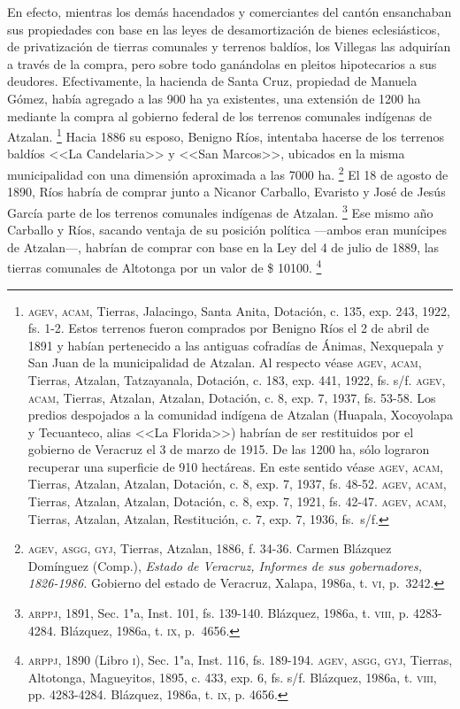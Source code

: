 \documentclass[14pt,twoside,final]{extbook} %
\let\oldfootnote\footnote
\renewcommand\footnote[1]{%
\oldfootnote{\hspace{1mm}#1}}
\begin{document}
En efecto, mientras los demás hacendados y comerciantes del cantón ensanchaban sus propiedades con base en las leyes de desamortización de bienes eclesiásticos, de privatización de tierras comunales y terrenos baldíos, los Villegas las adquirían a través de la compra, pero sobre todo ganándolas en pleitos hipotecarios a sus deudores. Efectivamente, la hacienda de Santa Cruz, propiedad de Manuela Gómez, había agregado a las 900 ha ya existentes, una extensión de 1200 ha mediante la compra al gobierno federal de los terrenos comunales indígenas de Atzalan.\footnote{\textsc{agev, acam}, Tierras, Jalacingo, Santa Anita, Dotación, c. 135, exp. 243, 1922, fs. 1-2. Estos terrenos fueron comprados por Benigno Ríos el 2 de abril de 1891 y habían pertenecido a las antiguas cofradías de Ánimas, Nexquepala y San Juan de la municipalidad de Atzalan. Al respecto véase \textsc{agev}, \textsc{acam}, Tierras, Atzalan, Tatzayanala, Dotación, c. 183, exp. 441, 1922, fs. s/f. \textsc{agev}, \textsc{acam}, Tierras, Atzalan, Atzalan, Dotación, c. 8, exp. 7, 1937, fs. 53-58. Los predios despojados a la comunidad indígena de Atzalan (Huapala, Xocoyolapa y Tecuanteco, alias <<La Florida>>) habrían de ser restituidos por el gobierno de Veracruz el 3 de marzo de 1915. De las 1200 ha, sólo lograron recuperar una superficie de 910 hectáreas. En este sentido véase \textsc{agev}, \textsc{acam}, Tierras, Atzalan, Atzalan, Dotación, c. 8, exp. 7, 1937, fs. 48-52. \textsc{agev}, \textsc{acam}, Tierras, Atzalan, Atzalan, Dotación, c. 8, exp. 7, 1921, fs. 42-47. \textsc{agev}, \textsc{acam}, Tierras, Atzalan, Atzalan, Restitución, c. 7, exp. 7, 1936, fs.~s/f.} Hacia 1886 su esposo, Benigno Ríos, intentaba hacerse de los terrenos baldíos <<La Candelaria>> y <<San Marcos>>, ubicados en la misma municipalidad con una dimensión aproximada a las 7000 ha.\footnote{\textsc{agev, asgg, gyj}, Tierras, Atzalan, 1886, f. 34-36. Carmen Blázquez Domínguez (Comp.), \emph{Estado de Veracruz, Informes de sus gobernadores, 1826-1986.} Gobierno del estado de Veracruz, Xalapa, 1986a, t. \textsc{vi}, p.~3242.} El 18 de agosto de 1890, Ríos habría de comprar junto a Nicanor Carballo, Evaristo y José de Jesús García parte de los terrenos comunales indígenas de Atzalan.\footnote{\textsc{arppj}, 1891, Sec. 1"a, Inst. 101, fs. 139-140. Blázquez, 1986a, t. \textsc{viii}, p. 4283-4284. Blázquez, 1986a, t. \textsc{ix}, p.~4656.} Ese mismo año Carballo y Ríos, sacando ventaja de su posición política ---ambos eran munícipes de Atzalan---, habrían de comprar con base en la Ley del 4 de julio de 1889, las tierras comunales de Altotonga por un valor de \$ 10100.\footnote{\textsc{arppj}, 1890 (Libro \textsc{i}), Sec. 1"a, Inst. 116, fs. 189-194. \textsc{agev, asgg, gyj}, Tierras, Altotonga, Magueyitos, 1895, c. 433, exp. 6, fs. s/f. Blázquez, 1986a, t. \textsc{viii}, pp. 4283-4284. Blázquez, 1986a, t. \textsc{ix}, p. 4656.}
\end{document}
